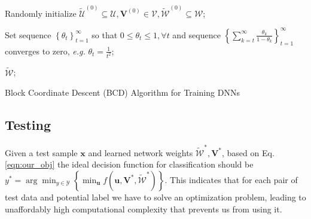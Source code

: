 \documentclass{article}
\providecommand{\SetAlgoLined}{\SetLine}
\def\eg{\emph{e.g. }}
\begin{document}
\begin{algorithm}[t]\footnotesize
\SetAlgoLined
{}
\BlankLine
Randomly initialize $\tilde{\mathcal{U}}^{(0)}\subseteq\mathcal{U}, \mathbf{V}^{(0)}\in\mathcal{V}, \tilde{\mathcal{W}}^{(0)}\subseteq\mathcal{W}$;
        
Set sequence $\left\{\theta_t\right\}_{t=1}^{\infty}$ so that $0\leq\theta_t\leq 1, \forall t$ and sequence $\left\{\sum_{k=t}^{\infty}\frac{\theta_k}{1-\theta_k}\right\}_{t=1}^{\infty}$ converges to zero, \eg $\theta_t = \frac{1}{t^2}$;
		
		\Return $\tilde{\mathcal{W}}$;
		\caption{Block Coordinate Descent (BCD) Algorithm for Training DNNs}\label{alg:bcd}
	\end{algorithm}
    
    
    
    
   
    

\subsection{Testing}\label{ssec:testing}
Given a test sample $\mathbf{x}$ and learned network weights $\tilde{\mathcal{W}}^*, \mathbf{V}^*$, based on Eq. \ref{eqn:our_obj} the ideal decision function for classification should be $y^*=\arg\min_{y\in\mathcal{Y}} \left\{ \min_{\mathbf{u}} f(\mathbf{u}, \mathbf{V}^*, \tilde{\mathcal{W}}^*) \right\}.$ This indicates that for each pair of test data and potential label we have to solve an optimization problem, leading to unaffordably high computational complexity that prevents us from using it. 
    
\end{document}
